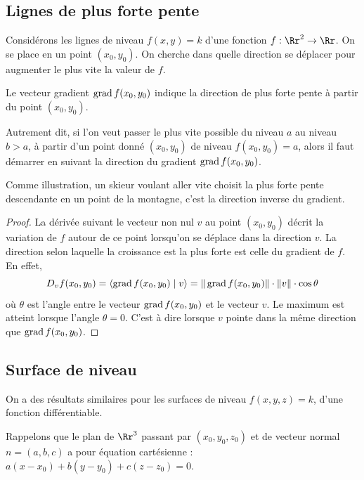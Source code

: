 \documentclass[12pt, class=report,crop=false]{standalone}
\begin{document}
\subsection{Lignes de plus forte pente}
 
Considérons les lignes de niveau $f(x,y)=k$ d'une fonction $f : \Rr^2 \to \Rr$.
On se place en un point $(x_0,y_0)$. On cherche dans quelle direction se déplacer pour augmenter le plus vite la valeur de $f$.
 
\begin{proposition}
Le vecteur gradient $\operatorname{grad} f(x_0,y_0)$ indique la direction de plus forte pente à partir du point $(x_0,y_0)$.
\end{proposition}


Autrement dit, si l'on veut passer le plus vite
possible du niveau $a$ au niveau $b>a$, à partir d'un point donné $(x_0,y_0)$ de niveau
$f(x_0,y_0)=a$, alors il faut démarrer en suivant la direction du gradient $\operatorname{grad} f(x_0,y_0)$. 


Comme illustration, un skieur voulant aller vite choisit 
la plus forte pente descendante en un point de la montagne, c'est la direction inverse du gradient. 
 
\begin{proof}
La dérivée suivant le vecteur non nul $v$ au point $(x_0,y_0)$ décrit la variation de $f$ autour de ce point lorsqu'on se déplace dans la direction $v$. 
La direction selon laquelle la croissance est la plus forte est celle du gradient de $f$. En effet,
$$D_{v}f(x_0,y_0)=\langle \operatorname{grad} f(x_0,y_0) \mid v\rangle=
\| \operatorname{grad} f(x_0,y_0) \| \cdot \| v \| \cdot \cos \theta$$
où $\theta$ est l'angle entre le vecteur $\operatorname{grad} f(x_0,y_0)$ et le vecteur $v$.
Le maximum est atteint lorsque l'angle $\theta=0$. C'est à dire lorsque $v$ pointe dans la même direction que $\operatorname{grad} f(x_0,y_0)$.
\end{proof}


\subsection{Surface de niveau}

On a des résultats similaires pour les surfaces de niveau $f(x,y,z)=k$, d'une fonction différentiable.

Rappelons que le plan de $\Rr^3$ passant par $(x_0,y_0,z_0)$ et de vecteur normal 
$n=(a,b,c)$ a pour équation cartésienne :
$a(x-x_0)+b(y-y_0)+c(z-z_0)=0$.
\end{document}
